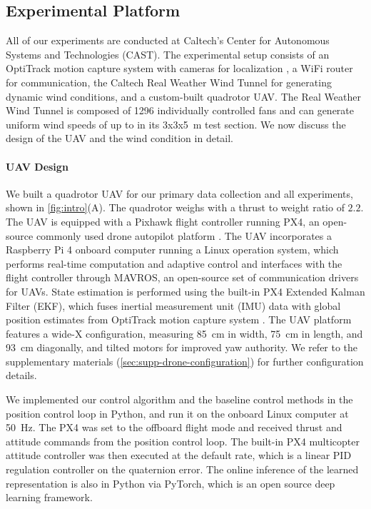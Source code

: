 \subsection*{Experimental Platform}
All of our experiments are conducted at Caltech's Center for Autonomous Systems and Technologies (CAST). The experimental setup consists of an OptiTrack motion capture system with  cameras for localization , a WiFi router for communication, the Caltech Real Weather Wind Tunnel
for generating dynamic wind conditions, and a custom-built quadrotor UAV. 
The Real Weather Wind Tunnel is composed of 1296 individually controlled fans and can generate uniform wind speeds of up to \revision{\highwind} in its 3x3x5\SI{}{m} test section. 
We now discuss the design of the UAV and the wind condition in detail.

\paragraph{UAV Design} We built a quadrotor UAV for our primary data collection and all experiments, shown in \cref{fig:intro}(A).
The quadrotor weighs  with a thrust to weight ratio of $2.2$. The UAV is equipped with a Pixhawk flight controller running PX4, an open-source commonly used drone autopilot platform \cite{meier_pixhawk_2012}. The UAV incorporates a Raspberry Pi 4 onboard computer running a Linux operation system, which performs real-time computation and adaptive control and interfaces with the flight controller through MAVROS, an open-source set of communication drivers for UAVs. State estimation is performed using the built-in PX4 Extended Kalman Filter (EKF), which fuses inertial measurement unit (IMU) data with global position estimates from OptiTrack motion capture system . The UAV platform features a wide-X configuration, measuring \SI{85}{cm} in width, \SI{75}{cm} in length, and \SI{93}{cm} diagonally, and tilted motors for improved yaw authority.  We refer to the supplementary materials (\ref{sec:supp-drone-configuration}) for further configuration details.

We implemented our control algorithm and the baseline control methods in the position control loop in Python, and run it on the onboard Linux computer at \SI{50}{Hz}. The PX4 was set to the offboard flight mode and received thrust and attitude commands from the position control loop. The built-in PX4 multicopter attitude controller was then executed at the default rate, which is a linear PID regulation controller on the quaternion error. The online inference of the learned representation is also in Python via PyTorch, which is an open source deep learning framework.

